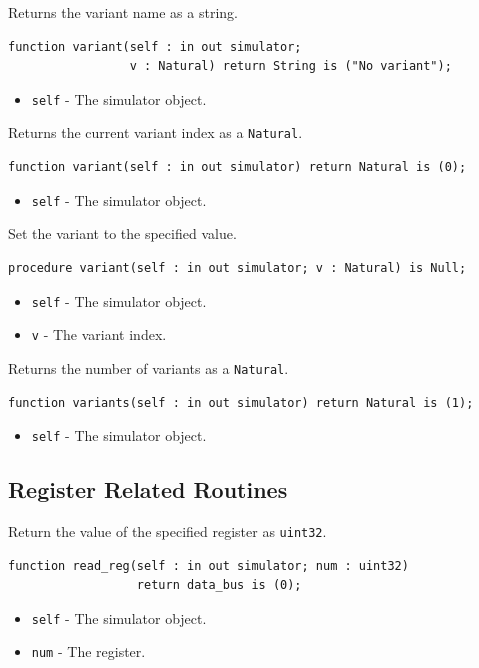 \documentclass[10pt, openany]{book}
\newcommand{\keyword}[1]{\texttt{#1}}
\newcommand{\datatype}[1]{\texttt{#1}}
\begin{document}
Returns the variant name as a string.
\begin{lstlisting}
function variant(self : in out simulator;
                 v : Natural) return String is ("No variant");
\end{lstlisting}
\begin{itemize}
  \item \keyword{self} - The simulator object.
\end{itemize}

Returns the current variant index as a \datatype{Natural}.
\begin{lstlisting}
function variant(self : in out simulator) return Natural is (0);
\end{lstlisting}
\begin{itemize}
  \item \keyword{self} - The simulator object.
\end{itemize}

Set the variant to the specified value.
\begin{lstlisting}
procedure variant(self : in out simulator; v : Natural) is Null;
\end{lstlisting}
\begin{itemize}
  \item \keyword{self} - The simulator object.
  \item \keyword{v} - The variant index.
\end{itemize}

Returns the number of variants as a \datatype{Natural}.
\begin{lstlisting}
function variants(self : in out simulator) return Natural is (1);
\end{lstlisting}
\begin{itemize}
  \item \keyword{self} - The simulator object.
\end{itemize}

\subsection{Register Related Routines}

Return the value of the specified register as \datatype{uint32}.
\begin{lstlisting}
function read_reg(self : in out simulator; num : uint32)
                  return data_bus is (0);
\end{lstlisting}
\begin{itemize}
  \item \keyword{self} - The simulator object.
  \item \keyword{num} - The register.
\end{itemize}
\end{document}

